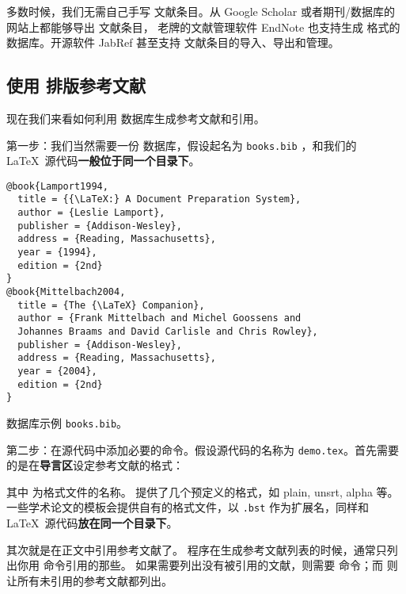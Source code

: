 多数时候，我们无需自己手写  文献条目。从 Google Scholar 或者期刊/数据库的网站上都能够导出  文献条目，
老牌的文献管理软件 EndNote 也支持生成  格式的数据库。开源软件 JabRef 甚至支持  文献条目的导入、导出和管理。

\subsection{使用  排版参考文献}\label{subsec:bibtex-use}

现在我们来看如何利用  数据库生成参考文献和引用。

第一步：我们当然需要一份  数据库，假设起名为 \texttt{books.bib} ，和我们的 \LaTeX\ 源代码\textbf{一般位于同一个目录下}。

\begin{sourcecode}[htp]
\begin{Verbatim}
@book{Lamport1994,
  title = {{\LaTeX:} A Document Preparation System},
  author = {Leslie Lamport},
  publisher = {Addison-Wesley},
  address = {Reading, Massachusetts},
  year = {1994},
  edition = {2nd}
}
@book{Mittelbach2004,
  title = {The {\LaTeX} Companion},
  author = {Frank Mittelbach and Michel Goossens and 
  Johannes Braams and David Carlisle and Chris Rowley},
  publisher = {Addison-Wesley},
  address = {Reading, Massachusetts},
  year = {2004},
  edition = {2nd}
}
\end{Verbatim}
\caption{ 数据库示例 \texttt{books.bib}。}
\end{sourcecode}

第二步：在源代码中添加必要的命令。假设源代码的名称为 \texttt{demo.tex}。首先需要的是在\textbf{导言区}设定参考文献的格式：
\begin{command}
\end{command}

其中  为格式文件的名称。 提供了几个预定义的格式，如 plain, unsrt, alpha 等。
一些学术论文的模板会提供自有的格式文件，以 \texttt{.bst} 作为扩展名，同样和 \LaTeX\ 源代码\textbf{放在同一个目录下}。

其次就是在正文中引用参考文献了。 程序在生成参考文献列表的时候，通常只列出你用  命令引用的那些。
如果需要列出没有被引用的文献，则需要  命令；而 \marg*{*} 则让所有未引用的参考文献都列出。

